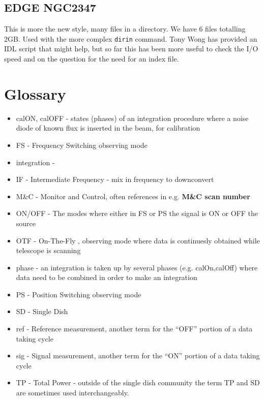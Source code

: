 \documentclass[12pt,a4paper]{article}
\begin{document}
\subsection{EDGE NGC2347}

This is more the new style, many files in a directory. We have 6 files totalling 2GB. Used with the more complex {\tt dirin} command.
Tony Wong has provided an IDL script that might help, but so far this has been more useful to check the I/O speed and on the question
for the need for an index file.

\section*{Glossary}

\begin{itemize}

\item calON, calOFF - states (phases) of an integration procedure where a noise diode of known flux is inserted in the beam, for calibration

\item FS - Frequency Switching observing mode

\item integration - 

\item IF - Intermediate Frequency - mix in frequency to downconvert
  
\item M\&C - Monitor and Control, often references in e.g. {\bf M\&C scan number }

\item ON/OFF - The modes where either in FS or PS the signal is ON or OFF the source

\item OTF - On-The-Fly , observing mode where data is continuesly obtained while telescope is scanning

\item phase - an integration is taken up by several phases (e.g. calOn,calOff) where data need to be combined in order to make an integration

\item PS - Position Switching observing mode

\item SD - Single Dish

\item ref - Reference measurement, another term for the ``OFF'' portion of a data taking cycle

\item sig -   Signal measurement,   another term for the ``ON'' portion of a data taking cycle

\item TP - Total Power - outside of the single dish community the term TP and SD are sometimes used interchangeably. 

  

  
\end{itemize}
\end{document}
